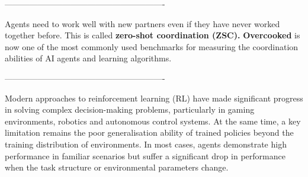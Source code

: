 %
%
%    
%    
%
%



----------------------------------------------------------

Agents need to work well with new partners even if they have never worked together before. This is called \textbf{zero-shot coordination (ZSC).}
\textbf{Overcooked} is now one of the most commonly used benchmarks for measuring the coordination abilities of AI agents and learning algorithms.

----------------------------------------------------------

Modern approaches to reinforcement learning (RL) have made significant progress in solving complex decision-making problems, particularly in gaming environments, robotics and autonomous control systems. At the same time, a key limitation remains the poor generalisation ability of trained policies beyond the training distribution of environments. In most cases, agents demonstrate high performance in familiar scenarios but suffer a significant drop in performance when the task structure or environmental parameters change.

